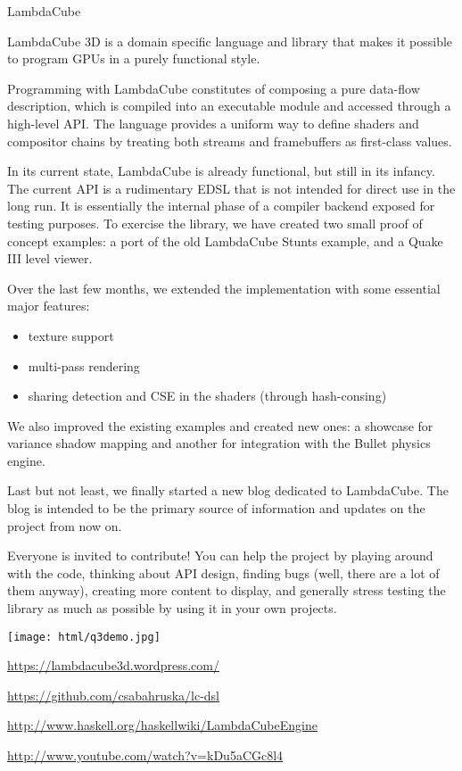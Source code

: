 \begin{hcarentry}[updated]{LambdaCube}
\makeheader

LambdaCube 3D is a domain specific language and library that makes it
possible to program GPUs in a purely functional style.

Programming with LambdaCube constitutes of composing a pure data-flow
description, which is compiled into an executable module and accessed
through a high-level API.  The language provides a uniform way to
define shaders and compositor chains by treating both streams and
framebuffers as first-class values.

In its current state, LambdaCube is already functional, but still in
its infancy.  The current API is a rudimentary EDSL that is not
intended for direct use in the long run.  It is essentially the
internal phase of a compiler backend exposed for testing purposes.  To
exercise the library, we have created two small proof of concept
examples: a port of the old LambdaCube Stunts example, and a Quake III
level viewer.

Over the last few months, we extended the implementation with some
essential major features:

\begin{itemize}
\item texture support
\item multi-pass rendering
\item sharing detection and CSE in the shaders (through hash-consing)
\end{itemize}

We also improved the existing examples and created new ones: a
showcase for variance shadow mapping and another for integration with
the Bullet physics engine.

Last but not least, we finally started a new blog dedicated to
LambdaCube.  The blog is intended to be the primary source of
information and updates on the project from now on.

Everyone is invited to contribute! You can help the project by playing
around with the code, thinking about API design, finding bugs (well,
there are a lot of them anyway), creating more content to display, and
generally stress testing the library as much as possible by using it
in your own projects.

\begin{center}
\texttt{[image: html/q3demo.jpg]}
\end{center}

\FurtherReading
\begin{compactitem}
\item \url{https://lambdacube3d.wordpress.com/}
\item \url{https://github.com/csabahruska/lc-dsl}
\item \url{http://www.haskell.org/haskellwiki/LambdaCubeEngine}
\item \url{http://www.youtube.com/watch?v=kDu5aCGc8l4}
\end{compactitem}
\end{hcarentry}
